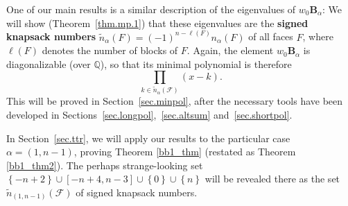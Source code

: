\documentclass[12pt]{article}
\theoremstyle{definition}%
\theoremstyle{definition}%
\theoremstyle{remark}%
\newcommand{\tup}[1]{\left( #1 \right)}
\newcommand{\interval}[1]{\left[ #1 \right]} %
\newcommand{\set}[1]{\left\{ #1 \right\}}
\newcommand{\QQ}{\mathbb{Q}}
\newcommand{\BBa}{\mathbf{B}_{\alpha}}
\newcommand{\CF}{\mathcal{F}}
\newcommand{\wo}{w_0} %
\newcommand{\na}{n_{ \alpha } }%
\newcommand{\nn}{\widetilde{n}}%
\newcommand{\nna}{\widetilde{n}_{ \alpha } }%
\newcommand{\defin}[1]{\textbf{#1}}
\begin{document}

One of our main results is a similar description of the eigenvalues of $\wo\BBa$:
We will show (Theorem~\ref{thm.mp.1}) that these eigenvalues are the \defin{signed knapsack numbers} $\nna\tup{F} = \tup{-1}^{n - \ell\tup{F}} \na\tup{F}$ of all faces $F$, where $\ell\tup{F}$ denotes the number of blocks of $F$.
Again, the element $\wo\BBa$ is diagonalizable (over $\QQ$), so that its minimal polynomial is therefore
\[
\prod_{k \in \nna\tup{\CF}} \tup{x-k} .
\]
This will be proved in Section~\ref{sec.minpol}, after the necessary tools have been developed in Sections~\ref{sec.longpol},~\ref{sec.altsum} and~\ref{sec.shortpol}.


In Section~\ref{sec.ttr}, we will apply our results to the particular case $\alpha = \tup{1, n-1}$, proving Theorem \ref{bb1_thm} (restated as Theorem \ref{bb1_thm2}).
The perhaps strange-looking set $\set{-n+2} \cup \interval{-n+4, n-3} \cup \set{0} \cup \set{n}$ will be revealed there as the set $\nn_{\tup{1,n-1}}\tup{\CF}$ of signed knapsack numbers.
\end{document}
